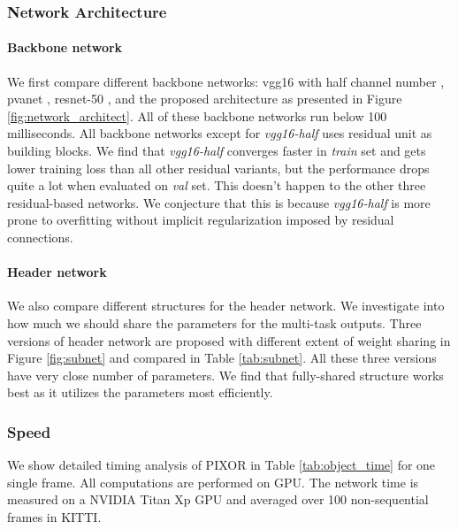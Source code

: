\vspace{-0.2cm}
\subsubsection{Network Architecture}

\vspace{-0.2cm}
\paragraph{Backbone network} We first compare different backbone networks: vgg16 with half channel number \cite{vgg}, pvanet \cite{pvanet}, resnet-50 \cite{resnet}, and the proposed architecture as presented in Figure \ref{fig:network_architect}. All of these backbone networks run below 100 milliseconds. All backbone networks except for {\it vgg16-half} uses residual unit as building blocks. We find that {\it vgg16-half} converges faster in {\it train} set and gets lower training loss than all other residual variants, but the performance drops quite a lot when evaluated on {\it val} set. This doesn't happen to the other three residual-based networks. We conjecture that this is because {\it vgg16-half} is more prone to overfitting without implicit regularization imposed by residual connections. 

\vspace{-0.2cm}
\paragraph{Header network} We also compare different structures for the header network. We investigate into how much we should share the parameters for the multi-task outputs. Three versions of header network are proposed with different extent of weight sharing in Figure \ref{fig:subnet} and compared in Table \ref{tab:subnet}. All these three versions have very close number of parameters. We find that fully-shared structure works best as it utilizes the parameters most efficiently.

\vspace{-0.2cm}
\subsubsection{Speed} We show detailed timing analysis of PIXOR in Table \ref{tab:object_time} for one single frame. All computations are performed on GPU. The network time is measured on a NVIDIA Titan Xp GPU and averaged over 100 non-sequential frames in KITTI.


